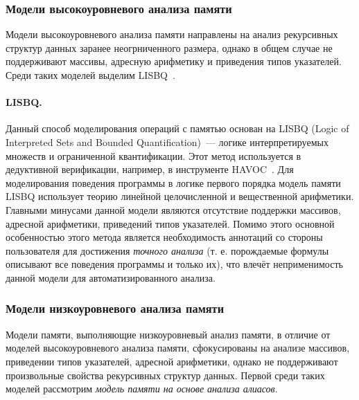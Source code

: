 \subsubsection{Модели высокоуровневого анализа памяти}

Модели высокоуровневого анализа памяти направлены на анализ рекурсивных структур данных заранее неогрниченного размера, однако в общем случае не поддерживают массивы, адресную арифметику и приведения типов указателей. Среди таких моделей выделим \textsc{LISBQ}~\cite{lahiri2008back}.

\paragraph{LISBQ.} Данный способ моделирования операций с памятью основан на LISBQ (Logic of Interpreted Sets and Bounded Quantification)~--- логике интерпретируемых множеств и ограниченной квантификации. Этот метод используется в дедуктивной верификации, например, в инструменте \textsc{HAVOC}~\cite{bornat2000proving}. Для моделирования поведения программы в логике первого порядка модель памяти LISBQ использует теорию линейной целочисленной и вещественной арифметики. Главными минусами данной модели являются отсутствие поддержки массивов, адресной арифметики, приведений типов указателей. Помимо этого основной особенностью этого метода является необходимость аннотаций со стороны пользователя для достижения \emph{точного анализа} (т. е. порождаемые формулы описывают все поведения программы и только их), что влечёт неприменимость данной модели для автоматизированного анализа.

\subsubsection{Модели низкоуровневого анализа памяти}

Модели памяти, выполняющие низкоуровневый анализ памяти, в отличие от моделей высокоуровневого анализа памяти, сфокусированы на анализе массивов, приведении типов указателей, адресной арифметики, однако не поддерживают произвольные свойства рекурсивных структур данных. Первой среди таких моделей рассмотрим \emph{модель памяти на основе анализа алиасов}.

